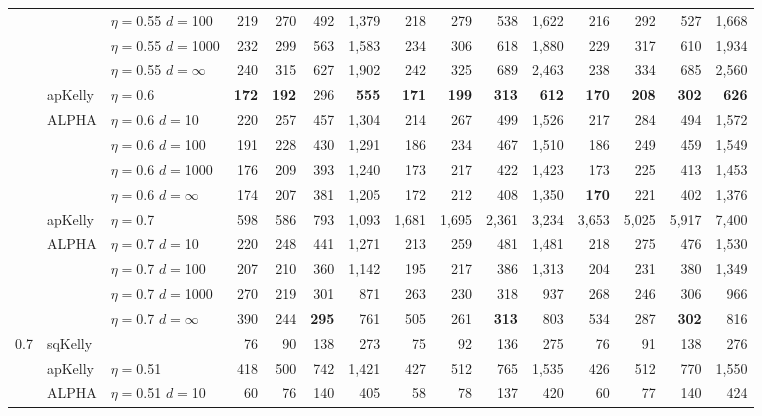\documentclass[aoas]{imsart}
\begin{document}
\begin{table}
\begin{tabular}{lll|rrrr|rrrr|rrrr}
&  & $\eta=$0.55 $d=$100 & 219  & 270  & 492  & 1,379  & 218  & 279  & 538  & 1,622  & 216  & 292  & 527  & 1,668  \\
&  & $\eta=$0.55 $d=$1000 & 232  & 299  & 563  & 1,583  & 234  & 306  & 618  & 1,880  & 229  & 317  & 610  & 1,934  \\
 &  & $\eta=$0.55 $d=\infty$ & 240  & 315  & 627  & 1,902  & 242  & 325  & 689  & 2,463  & 238  & 334  & 685  & 2,560  \\
\cline{2-15} & apKelly & $\eta=$0.6 & \bf{172}  & \bf{192}  & 296  & \bf{555}  & \bf{171}  & \bf{199}  & \bf{313}  & \bf{612}  & \bf{170}  & \bf{208}  & \bf{302}  & \bf{626}  \\
\cline{2-15}
& ALPHA & $\eta=$0.6 $d=$10 & 220  & 257  & 457  & 1,304  & 214  & 267  & 499  & 1,526  & 217  & 284  & 494  & 1,572  \\
&  & $\eta=$0.6 $d=$100 & 191  & 228  & 430  & 1,291  & 186  & 234  & 467  & 1,510  & 186  & 249  & 459  & 1,549  \\
&  & $\eta=$0.6 $d=$1000 & 176  & 209  & 393  & 1,240  & 173  & 217  & 422  & 1,423  & 173  & 225  & 413  & 1,453  \\
 &  & $\eta=$0.6 $d=\infty$ & 174  & 207  & 381  & 1,205  & 172  & 212  & 408  & 1,350  & \bf{170}  & 221  & 402  & 1,376  \\
\cline{2-15} & apKelly & $\eta=$0.7 & 598  & 586  & 793  & 1,093  & 1,681  & 1,695  & 2,361  & 3,234  & 3,653  & 5,025  & 5,917  & 7,400  \\
\cline{2-15}
& ALPHA & $\eta=$0.7 $d=$10 & 220  & 248  & 441  & 1,271  & 213  & 259  & 481  & 1,481  & 218  & 275  & 476  & 1,530  \\
&  & $\eta=$0.7 $d=$100 & 207  & 210  & 360  & 1,142  & 195  & 217  & 386  & 1,313  & 204  & 231  & 380  & 1,349  \\
&  & $\eta=$0.7 $d=$1000 & 270  & 219  & 301  & 871  & 263  & 230  & 318  & 937  & 268  & 246  & 306  & 966  \\
 &  & $\eta=$0.7 $d=\infty$ & 390  & 244  & \bf{295}  & 761  & 505  & 261  & \bf{313}  & 803  & 534  & 287  & \bf{302}  & 816  \\
\hline 0.7 & sqKelly & & 76  & 90  & 138  & 273  & 75  & 92  & 136  & 275  & 76  & 91  & 138  & 276  \\
\cline{2-15} & apKelly & $\eta=$0.51 & 418  & 500  & 742  & 1,421  & 427  & 512  & 765  & 1,535  & 426  & 512  & 770  & 1,550  \\
\cline{2-15}
& ALPHA & $\eta=$0.51 $d=$10 & 60  & 76  & 140  & 405  & 58  & 78  & 137  & 420  & 60  & 77  & 140  & 424  \\

\end{tabular}
\end{table}
\end{document}
